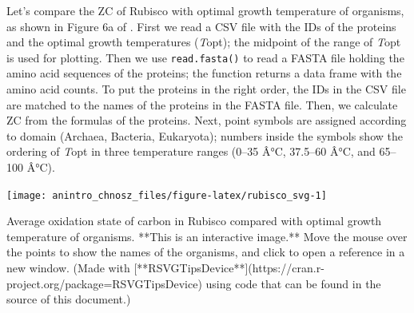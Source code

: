 \documentclass[]{tufte-handout}
\begin{document}
Let's compare the ZC of Rubisco with optimal growth temperature of
organisms, as shown in Figure 6a of \citet{Dic14}. First we read a CSV
file with the IDs of the proteins and the optimal growth temperatures
(\emph{T}opt); the midpoint of the range of \emph{T}opt is used for
plotting. Then we use {\texttt{read.fasta()}} to read a FASTA file
holding the amino acid sequences of the proteins; the function returns a
data frame with the amino acid counts. To put the proteins in the right
order, the IDs in the CSV file are matched to the names of the proteins
in the FASTA file. Then, we calculate ZC from the formulas of the
proteins. Next, point symbols are assigned according to domain (Archaea,
Bacteria, Eukaryota); numbers inside the symbols show the ordering of
\emph{T}opt in three temperature ranges (0--35 Â°C, 37.5--60 Â°C, and
65--100 Â°C).

\begin{marginfigure}
\texttt{[image: anintro\_chnosz\_files/figure-latex/rubisco\_svg-1]} \caption[Average oxidation state of carbon in Rubisco compared with optimal growth temperature of organisms]{Average oxidation state of carbon in Rubisco compared with optimal growth temperature of organisms. **This is an interactive image.** Move the mouse over the points to show the names of the organisms, and click to open a reference in a new window. (Made with [**RSVGTipsDevice**](https://cran.r-project.org/package=RSVGTipsDevice) using code that can be found in the source of this document.)}\label{fig:rubisco_svg}
\end{marginfigure}
\end{document}
